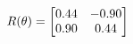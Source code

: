 \documentclass[preview]{standalone}
\begin{document}
\begin{align*}
\special{dvisvgm:raw <g id='unique000'>}R(\theta) = \begin{bmatrix}0.44 & -0.90\\0.90 & 0.44\end{bmatrix}\special{dvisvgm:raw </g>}
\end{align*}
\end{document}
